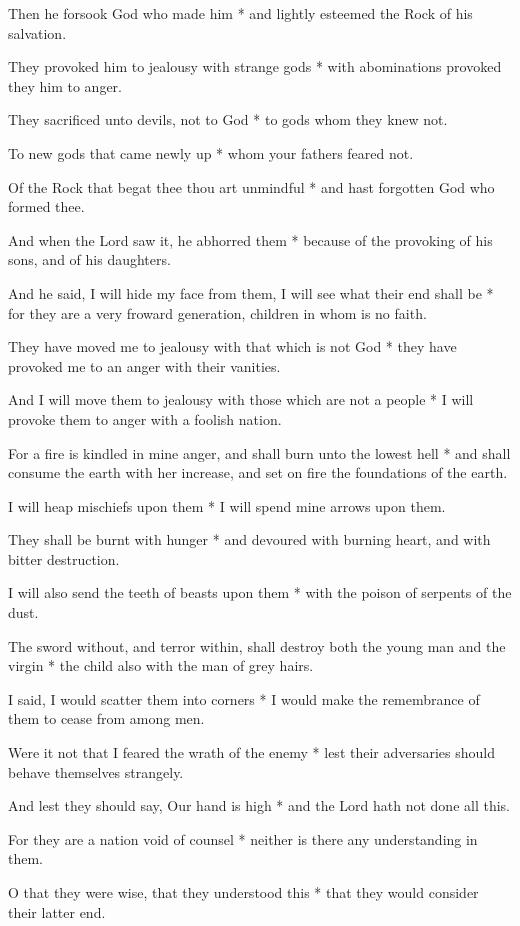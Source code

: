 Then he forsook God who made him * and lightly esteemed the Rock of his salvation.

They provoked him to jealousy with strange gods * with abominations provoked they him to anger.

They sacrificed unto devils, not to God * to gods whom they knew not.

To new gods that came newly up * whom your fathers feared not.

Of the Rock that begat thee thou art unmindful * and hast forgotten God who formed thee.

And when the Lord saw it, he abhorred them * because of the provoking of his sons, and of his daughters.

And he said, I will hide my face from them, I will see what their end shall be * for they are a very froward generation, children in whom is no faith.

They have moved me to jealousy with that which is not God * they have provoked me to an anger with their vanities.

And I will move them to jealousy with those which are not a people * I will provoke them to anger with a foolish nation.

For a fire is kindled in mine anger, and shall burn unto the lowest hell * and shall consume the earth with her increase, and set on fire the foundations of the earth.

I will heap mischiefs upon them * I will spend mine arrows upon them.

They shall be burnt with hunger * and devoured with burning heart, and with bitter destruction.

I will also send the teeth of beasts upon them * with the poison of serpents of the dust.

The sword without, and terror within, shall destroy both the young man and the virgin * the child also with the man of grey hairs.

I said, I would scatter them into corners * I would make the remembrance of them to cease from among men.

Were it not that I feared the wrath of the enemy * lest their adversaries should behave themselves strangely.

And lest they should say, Our hand is high * and the Lord hath not done all this.

For they are a nation void of counsel * neither is there any understanding in them.

O that they were wise, that they understood this * that they would consider their latter end.

